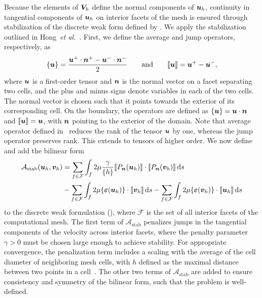 \documentclass{WileyMSP-template}
\begin{document}
Because the elements of $\bm{V}_h$ define the normal components of $\bm{u}_h$,
continuity in tangential components of $\bm{u}_h$ on interior facets of
the mesh is ensured through stabilization
of the discrete weak form defined by .
We apply the stabilization outlined in Hong~\emph{et al.}~\cite{Hong2016AEquations}.
First, we define the average and jump operators, respectively, as
\begin{equation}
    \{\bm{u}\} = \frac{\bm{u}^+\cdot\bm{n}^+ - \bm{u}^-\cdot\bm{n}^-}{2}
    \qquad\mathrm{and}\qquad \llbracket\bm{u}\rrbracket = \bm{u}^+ - \bm{u}^-,
    \label{eq:operators_BDM}
\end{equation}
where $\bm{u}$ is a first-order tensor and 
$\bm{n}$ is the normal vector on a facet separating two cells,
and the plus and minus signs denote variables in each of the two cells.
The normal vector is chosen such that it points towards the exterior of
its corresponding cell. On the boundary, the operators are defined as
$\{\bm{u}\} = \bm{u}\cdot\bm{n}$ and $\llbracket\bm{u}\rrbracket = \bm{u}$,
with $\bm{n}$ pointing to the exterior of the domain. Note that average operator
defined in~ reduces the rank of the tensor $\bm{u}$ by one,
whereas the jump operator preserves rank. This extends to tensors of higher order.
We now define and add the bilinear form
\begin{align*}
    \mathcal{A}_{\mathrm{stab}}(\bm{u}_h, \bm{v}_h) &=
    \sum_{f\in \mathcal{F}}\int_f{2\mu\frac{\gamma}{\{h\}}\llbracket P_{\bm{n}}(\bm{u}_h)\rrbracket
    \cdot\llbracket P_{\bm{n}}(\bm{v}_h)\rrbracket}\,\mathrm ds\\
    &-\sum_{f\in \mathcal{F}}\int_f{2\mu\{\bm{\varepsilon}(\bm{u}_h)\}\cdot\llbracket\bm{v}_h\rrbracket}\,\mathrm ds
    -\sum_{f\in \mathcal{F}}\int_f{2\mu\{\bm{\varepsilon}(\bm{v}_h)\}\cdot\llbracket\bm{u}_h\rrbracket}\,\mathrm ds
\end{align*}
to the discrete weak formulation (),
where $\mathcal{F}$ is the set of all interior facets of the computational mesh.
The first term of $\mathcal{A}_{\mathrm{stab}}$ penalizes jumps
in the tangential components of the velocity
across interior facets, where the penalty parameter $\gamma>0$ must be chosen large enough
to achieve stability. For appropriate convergence, the penalization term
includes a scaling with the average of the cell diameter of neighboring mesh cells,
with $h$ defined as the maximal distance between two points in a cell~\cite{Nitsche1971UberSind}.
The other two terms
of $\mathcal{A}_{\mathrm{stab}}$ are added to ensure consistency and symmetry of
the bilinear form, such that the problem is well-defined.
\end{document}
